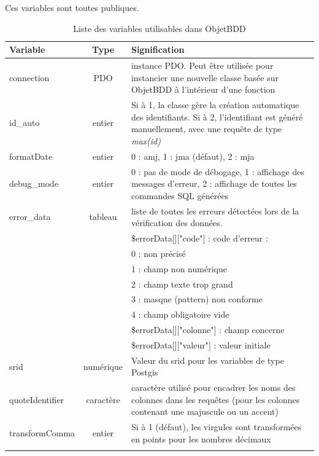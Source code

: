 Ces variables sont toutes publiques.
\begin{longtable}{|p{3cm}|c|p{8.5cm}|}
\hline
\textbf{Variable} & \textbf{Type} & \textbf{Signification} \\
\hline
\endhead
\hline\endfoot\endlastfoot
connection & PDO & instance PDO. Peut être utilisée pour instancier une nouvelle classe basée sur ObjetBDD à l'intérieur d'une fonction \\

id\_auto & entier & Si à 1, la classe gère la création automatique des identifiants. Si à 2, l'identifiant est généré manuellement, avec une requête de type \textit{max(id)} \\

formatDate & entier & 0 : amj, 1 : jma (défaut), 2 : mja \\

debug\_mode & entier & 0 : pas de mode de débogage, 1 : affichage des messages d'erreur, 2 : affichage de toutes les commandes SQL générées
\\

error\_data & tableau & liste de toutes les erreurs détectées lors de la vérification des données.  \\
 & & \$errorData[]["code"] : code d'erreur : \\
	& & 0 : non précisé \\
	& & 1 : champ non numérique \\
	& & 2 : champ texte trop grand \\
	& & 3 : masque (pattern) non conforme \\
	& & 4 : champ obligatoire vide \\
	& & \$errorData[]["colonne"] : champ concerne \\
	& & \$errorData[]["valeur"] : valeur initiale \\

srid & numérique & Valeur du srid pour les variables de type Postgis \\

quoteIdentifier & caractère & caractère utilisé pour encadrer les noms des colonnes dans les requêtes (pour les colonnes contenant une majuscule ou un accent) \\

transformComma & entier & Si à 1 (défaut), les virgules sont transformées en points pour les nombres décimaux \\
\hline

\caption{Liste des variables utilisables dans ObjetBDD}

\end{longtable}


